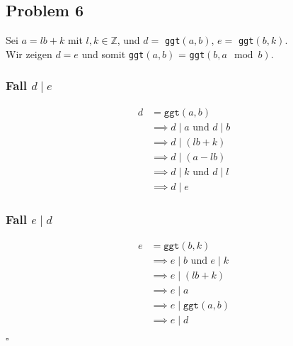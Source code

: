 \documentclass[12pt, german]{article}
\newcommand{\bewiesen}{\begin{flushright}$\square$ \end{flushright} }
\begin{document}
    \subsection*{Problem 6}
 	Sei $a = lb + k$ mit $l,k \in \mathbb{Z}$, und $d=$ \texttt{ggt$(a,b)$}, $e=$ \texttt{ggt$(b,k)$}.\\ Wir zeigen $d = e$ und somit \texttt{ggt$(a,b)$} = \texttt{ggt$(b,a\mod b)$}. 
   \subsubsection*{Fall $d \mid e$}
   \begin{align*}
   	d &= \texttt{ggt}(a,b) \\
   	&\implies d \mid a \text{ und } d \mid b \\
   	&\implies d \mid (lb + k) \\
   	&\implies d \mid (a - lb) \\
   	&\implies d \mid k \text{ und } d \mid l \\
   	&\implies d \mid e
    \end{align*} 
  
  \subsubsection*{Fall $e \mid d$}
    \begin{align*}
    	e &= \texttt{ggt}(b,k) \\
    		&\implies e \mid b \text{ und } e \mid k \\
    		&\implies e \mid  (lb +k) \\
    		&\implies e \mid a \\
    		&\implies e \mid \texttt{ggt}(a,b) \\
    		&\implies e \mid d
    \end{align*} 
    \bewiesen
    		
    
    
    
\end{document}
